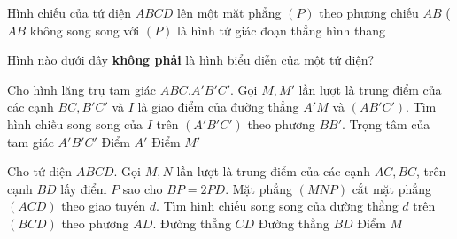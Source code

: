 \begin{ex}%
	Hình chiếu của tứ diện $ABCD$ lên một mặt phẳng $(P)$ theo phương chiếu $AB$ ($AB$ không song song với $(P)$ là
	{hình tứ giác}
	{đoạn thẳng}
	{hình thang}
\end{ex}

\begin{ex}%
	Hình nào dưới đây \textbf{không phải} là hình biểu diễn của một tứ diện?
	\def\dotEX{}
\end{ex}



\begin{ex}%
	Cho hình lăng trụ tam giác $ABC.A'B'C'$. Gọi $M, M'$ lần lượt là trung điểm của các cạnh $BC, B'C'$ và $I$ là giao điểm của đường thẳng $A'M$ và $(AB'C')$. Tìm hình chiếu song song của $I$ trên $(A'B'C')$ theo phương $BB'$.
	{Trọng tâm của tam giác $A'B'C'$}
	{Điểm $A'$}
	{Điểm $M'$}
\end{ex}
\begin{ex}%
	Cho tứ diện $ABCD$. Gọi $M, N$ lần lượt là trung điểm của các cạnh $AC, BC$, trên cạnh $BD$ lấy điểm $P$ sao cho $BP=2PD$. Mặt phẳng $(MNP)$ cắt mặt phẳng $(ACD)$ theo giao tuyến $d$. Tìm hình chiếu song song của đường thẳng $d$ trên $(BCD)$ theo phương $AD$.
	{\True Đường thẳng $CD$}
	{Đường thẳng $BD$}
	{Điểm $M$}
\end{ex}


